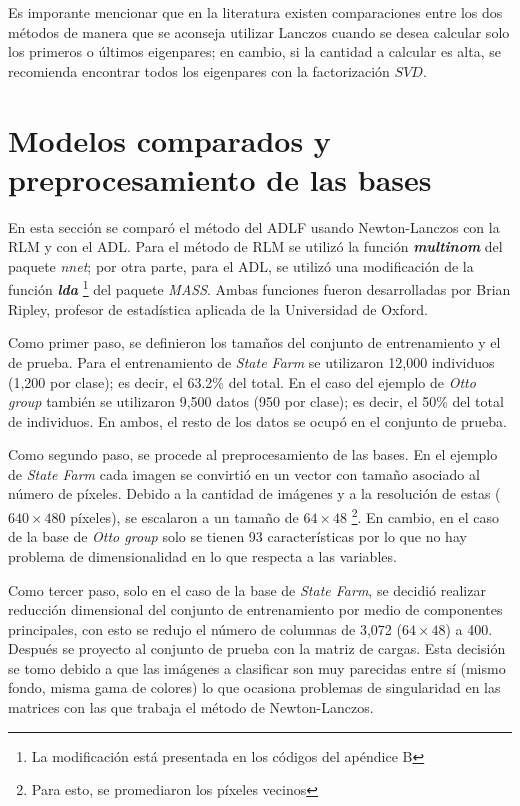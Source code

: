 Es imporante mencionar que en la literatura existen comparaciones entre los dos métodos de manera que se aconseja utilizar Lanczos cuando se desea calcular solo los primeros o últimos eigenpares; en cambio, si la cantidad a calcular es alta, se recomienda encontrar todos los eigenpares con la factorización $SVD$. \cite{demmel1997applied} \cite{lanczos1988applied}

\section{Modelos comparados y preprocesamiento de las bases}

En esta sección se comparó el método del ADLF usando Newton-Lanczos con la RLM y con el ADL. Para el método de RLM se utilizó la función \textbf{\textit{multinom}} del paquete \textit{nnet}; por otra parte, para el ADL, se utilizó una modificación de la función \textbf{\textit{lda}} \footnote{La modificación está presentada en los códigos del apéndice B} del paquete \textit{MASS}. Ambas funciones fueron desarrolladas por Brian Ripley, profesor de estadística aplicada de la Universidad de Oxford. 

Como primer paso, se definieron los tamaños del conjunto de entrenamiento y el de prueba. Para el entrenamiento de \textit{State Farm} se utilizaron 12,000 individuos (1,200 por clase); es decir, el 63.2\% del total. En el caso del ejemplo de \textit{Otto group} también se utilizaron 9,500 datos (950 por clase); es decir, el 50\% del total de individuos. En ambos, el resto de los datos se ocupó en el conjunto de prueba. 

Como segundo paso, se procede al preprocesamiento de las bases. En el ejemplo de \textit{State Farm} cada imagen se convirtió en un vector con tamaño asociado al número de píxeles. Debido a la cantidad de imágenes y a la resolución de estas ($640 \times 480$ píxeles), se escalaron a un tamaño de $64 \times 48$ \footnote{Para esto, se promediaron los píxeles vecinos}. En cambio, en el caso de la base de \textit{Otto group} solo se tienen 93 características por lo que no hay problema de dimensionalidad en lo que respecta a las variables.

Como tercer paso, solo en el caso de la base de \textit{State Farm}, se decidió realizar reducción dimensional del conjunto de entrenamiento por medio de componentes principales, con esto se redujo el número de columnas de 3,072 ($64 \times 48$) a 400. Después se proyecto al conjunto de prueba con la matriz de cargas. Esta decisión se tomo debido a que las imágenes a clasificar son muy parecidas entre sí (mismo fondo, misma gama de colores) lo que ocasiona problemas de singularidad en las matrices con las que trabaja el método de Newton-Lanczos. 

